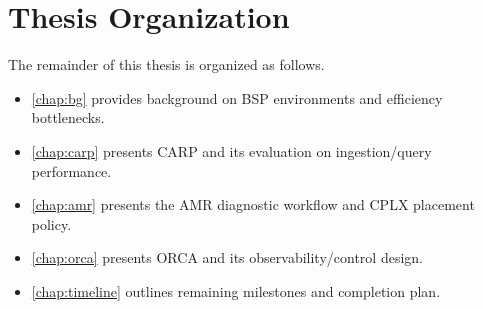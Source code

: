 \section{Thesis Organization}
\label{sec:intro:org}

The remainder of this thesis is organized as follows.
\begin{itemize}
  \item \cref{chap:bg} provides background on BSP environments and efficiency bottlenecks.
  \item \cref{chap:carp} presents CARP and its evaluation on ingestion/query performance.
  \item \cref{chap:amr} presents the AMR diagnostic workflow and CPLX placement policy.
  \item \cref{chap:orca} presents ORCA and its observability/control design.
  \item \cref{chap:timeline} outlines remaining milestones and completion plan.
\end{itemize}
